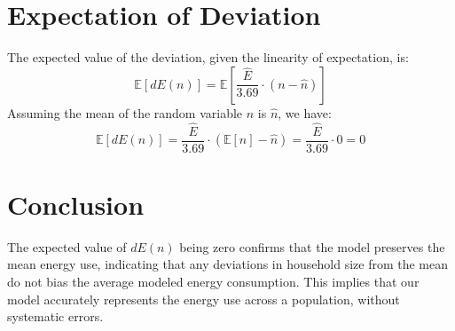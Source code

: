 \documentclass{article}
\begin{document}
\section{Expectation of Deviation}
The expected value of the deviation, given the linearity of expectation, is:
\[
\mathbb{E}[dE(n)] = \mathbb{E}\left[\frac{\hat{E}}{3.69} \cdot (n - \hat{n})\right]
\]
Assuming the mean of the random variable \(n\) is \(\hat{n}\), we have:
\[
\mathbb{E}[dE(n)] = \frac{\hat{E}}{3.69} \cdot (\mathbb{E}[n] - \hat{n}) = \frac{\hat{E}}{3.69} \cdot 0 = 0
\]

\section{Conclusion}
The expected value of \(dE(n)\) being zero confirms that the model preserves the mean energy use, indicating that any deviations in household size from the mean do not bias the average modeled energy consumption. This implies that our model accurately represents the energy use across a population, without systematic errors.
\end{document}
